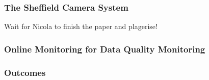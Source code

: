 \subsubsection{The Sheffield Camera System}\label{sec:35tCameraSystem}

Wait for Nicola to finish the paper and plagerise!

\subsubsection{Online Monitoring for Data Quality Monitoring}\label{sec:35tOnlineMonitoring}

\subsubsection{Outcomes}\label{sec:35tPhaseIIOutcomes}






































